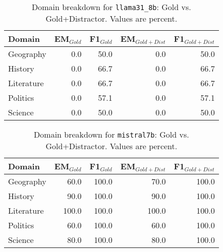 \begin{table}[t]\centering
\caption{Domain breakdown for \texttt{llama31_8b}: Gold vs. Gold+Distractor. Values are percent.}
\label{tab:domain-llama31_8b}
\begin{tabular}{lrrrr}
\toprule
Domain & EM$_{Gold}$ & F1$_{Gold}$ & EM$_{Gold+Dist}$ & F1$_{Gold+Dist}$ \\
\midrule
Geography & 0.0 & 50.0 & 0.0 & 50.0 \\
History & 0.0 & 66.7 & 0.0 & 66.7 \\
Literature & 0.0 & 66.7 & 0.0 & 66.7 \\
Politics & 0.0 & 57.1 & 0.0 & 57.1 \\
Science & 0.0 & 50.0 & 0.0 & 50.0 \\
\bottomrule
\end{tabular}
\end{table}

\begin{table}[t]\centering
\caption{Domain breakdown for \texttt{mistral7b}: Gold vs. Gold+Distractor. Values are percent.}
\label{tab:domain-mistral7b}
\begin{tabular}{lrrrr}
\toprule
Domain & EM$_{Gold}$ & F1$_{Gold}$ & EM$_{Gold+Dist}$ & F1$_{Gold+Dist}$ \\
\midrule
Geography & 60.0 & 100.0 & 70.0 & 100.0 \\
History & 90.0 & 100.0 & 90.0 & 100.0 \\
Literature & 100.0 & 100.0 & 100.0 & 100.0 \\
Politics & 60.0 & 100.0 & 60.0 & 100.0 \\
Science & 80.0 & 100.0 & 80.0 & 100.0 \\
\bottomrule
\end{tabular}
\end{table}

